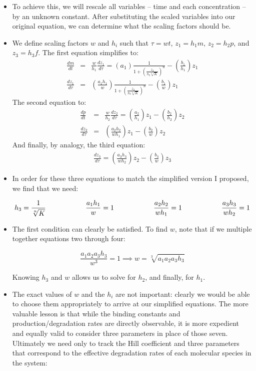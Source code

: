 \documentclass{article}
\begin{document}
\begin{itemize}
\item To achieve this, we will rescale all variables -- time and each concentration -- by an unknown constant. After substituting the scaled variables into our original equation, we can determine what the scaling factors should be.

\item We define scaling factors $w$ and $h_i$ such that $\tau = wt$, $z_1 = h_1 m$, $z_2 = h_2 p$, and $z_3 = h_3 f$. The first equation simplifies to:
\begin{eqnarray*}
\frac{dm}{dt} &=&\frac{w}{h_1} \frac{dz_1}{d\tau} = \left( a_1 \right) \frac{1}{1 + (\frac{z_3}{h_3 \sqrt[n]{K}})^n} - \left( \frac{b_1}{h_1} \right) z_1\\
\frac{dz_1}{d\tau}& =& \left( \frac{a_1h_1}{w} \right) \frac{1}{1 + (\frac{z_3}{h_3 \sqrt[n]{K}})^n} - \left( \frac{b_1}{w} \right) z_1
\end{eqnarray*}
The second equation to:
\begin{eqnarray*}
\frac{dp}{dt}& = &\frac{w}{h_2} \frac{dz_2}{d\tau} = \left( \frac{a_2}{h_1} \right) z_1 -  \left( \frac{b_2}{h_2} \right) z_2\\
\frac{dz_2}{d\tau}& = &\left( \frac{a_2 h_2}{wh_1} \right) z_1 -  \left( \frac{b_2}{w} \right) z_2
\end{eqnarray*}
And finally, by analogy, the third equation:
\begin{eqnarray*}
\frac{dz_3}{d\tau} = \left( \frac{a_3 h_3}{wh_2} \right) z_2 -  \left( \frac{b_3}{w} \right) z_3
\end{eqnarray*}

\item In order for these three equations to match the simplified version I proposed, we find that we need:

\[ h_3 = \frac{1}{\sqrt[n]{K}} \hspace{2 cm} \frac{a_1h_1}{w} = 1 \hspace{2 cm}  \frac{a_2h_2}{wh_1} = 1 \hspace{ 2 cm} \frac{a_3h_3}{wh_2} = 1 \]

\item The first condition can clearly be satisfied. To find $w$, note that if we multiple together equations two through four:

\[ \frac{a_1 a_2 a_3 h_3}{w^3} = 1 \implies w = \sqrt[3]{a_1 a_2 a_3 h_3} \]

Knowing $h_3$ and $w$ allows us to solve for $h_2$, and finally, for $h_1$.

\item The exact values of $w$ and the $h_i$ are not important: clearly we would be able to choose them appropriately to arrive at our simplified equations. The more valuable lesson is that while the binding constants and production/degradation rates are directly observable, it is more expedient and equally valid to consider three parameters in place of those seven. Ultimately we need only to track the Hill coefficient and three parameters that correspond to the effective degradation rates of each molecular species in the system:


\end{itemize}
\end{document}
